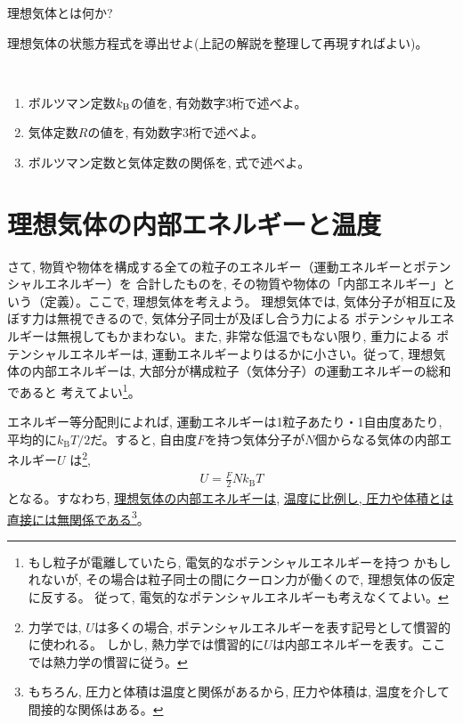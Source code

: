 \begin{q}\label{q:def_ideal_gas}
理想気体とは何か?
\end{q}\mv

\begin{q}\label{q:ideal_gas_eq}
理想気体の状態方程式を導出せよ(上記の解説を整理して再現すればよい)。
\end{q}\mv

\begin{q}\label{q:tempera_kBR}　
\begin{enumerate}
\item ボルツマン定数$k_{\text B}$の値を, 有効数字3桁で述べよ。
\item 気体定数$R$の値を, 有効数字3桁で述べよ。
\item ボルツマン定数と気体定数の関係を, 式で述べよ。
\end{enumerate}\end{q}
\hv



\section{理想気体の内部エネルギーと温度}

さて, 物質や物体を構成する全ての粒子のエネルギー（運動エネルギーとポテンシャルエネルギー）を
合計したものを, その物質や物体の「内部エネルギー」という（定義）。ここで, 理想気体を考えよう。 
理想気体では, 気体分子が相互に及ぼす力は無視できるので, 気体分子同士が及ぼし合う力による
ポテンシャルエネルギーは無視してもかまわない。また, 非常な低温でもない限り, 重力による
ポテンシャルエネルギーは, 運動エネルギーよりはるかに小さい。従って, 
理想気体の内部エネルギーは, 大部分が構成粒子（気体分子）の運動エネルギーの総和であると
考えてよい\footnote{もし粒子が電離していたら, 電気的なポテンシャルエネルギーを持つ
かもしれないが, その場合は粒子同士の間にクーロン力が働くので, 理想気体の仮定に反する。
従って, 電気的なポテンシャルエネルギーも考えなくてよい。}。

エネルギー等分配則によれば, 運動エネルギーは1粒子あたり・1自由度あたり, 
平均的に$k_{\text{B}}T/2$だ。すると, 自由度$F$を持つ気体分子が$N$個からなる気体の内部エネルギー$U$
は\footnote{力学では, $U$は多くの場合, ポテンシャルエネルギーを表す記号として慣習的に使われる。
しかし, 熱力学では慣習的に$U$は内部エネルギーを表す。ここでは熱力学の慣習に従う。}, 
\begin{eqnarray}U=\frac{F}{2}Nk_{\text{B}}T\label{eq:gas_int_energy0}\end{eqnarray}
となる。すなわち, \underline{理想気体の内部エネルギーは}, \underline{温度に比例し, 
圧力や体積とは直接には無関係である}\footnote{もちろん, 圧力と体積は温度と関係があるから, 
圧力や体積は, 温度を介して間接的な関係はある。}。

